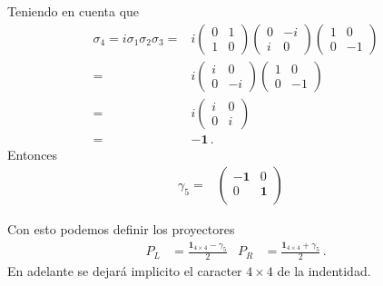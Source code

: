 \begin{frame}
Teniendo en cuenta que
\begin{align}
  \sigma_4=i\sigma_1\sigma_2\sigma_3=&
  i\begin{pmatrix}
    0 & 1 \\
    1 & 0 
  \end{pmatrix}
  \begin{pmatrix}
    0 & -i \\
    i & 0
  \end{pmatrix}
  \begin{pmatrix}
    1 & 0 \\
    0 & -1
  \end{pmatrix}\nonumber\\
  =&
  i\begin{pmatrix}
    i & 0 \\
    0 & -i 
  \end{pmatrix}
  \begin{pmatrix}
    1 & 0 \\
    0 & -1
  \end{pmatrix}\nonumber\\
  =&i\begin{pmatrix}
    i & 0 \\
    0 & i
  \end{pmatrix}\nonumber\\
  =&-\mathbf{1}\,.
\end{align}
Entonces
\begin{align}
  \gamma_5=&
  \begin{pmatrix}
    -\mathbf{1} & 0\\
    0  & \mathbf{1}\\
  \end{pmatrix}& 
\end{align}

Con esto podemos definir los proyectores
\begin{align}
  P_L&=\frac{\mathbf{1}_{4\times4}-\gamma_5}{2} & P_R&=\frac{\mathbf{1}_{4\times4}+\gamma_5}{2}\,.
\end{align}
En adelante se dejará implicito el caracter $4\times4$ de la indentidad. 


\end{frame}
